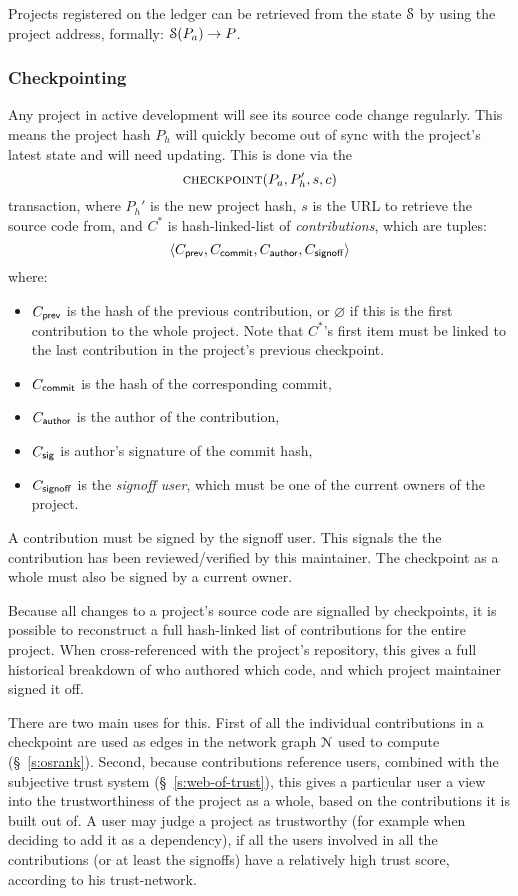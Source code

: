 Projects registered on the ledger can be retrieved from the state $\mathcal{S}$ by
using the project address, formally: $\mathcal{S}(P_a) \to P$.

\subsubsection{Checkpointing} Any project in active development will see its
source code change regularly. This means the project hash $P_h$ will quickly
become out of sync with the project's latest state and will need updating. This
is done via the
\[
    \text{\normalfont\scshape checkpoint}\small{\lparen P_a, P_h', s, c\rparen}
\]
transaction, where $P_h'$ is the new project hash, $s$ is the URL to
retrieve the source code from, and $C^*$ is hash-linked-list of
\emph{contributions}, which are tuples:
\[
   \langle C_{\mathsf{prev}}, C_{\mathsf{commit}}, C_{\mathsf{author}}, C_{\mathsf{signoff}}\rangle
\]
where:
\begin{itemize}
\item $C_{\mathsf{prev}}$ is the hash of the previous contribution, or
  $\varnothing$ if this is the first contribution to the whole
  project. Note that $C^*$'s first item must be linked to the last
  contribution in the project's previous checkpoint.
\item $C_{\mathsf{commit}}$ is the hash of the corresponding commit,
\item $C_{\mathsf{author}}$ is the author of the contribution,
\item $C_{\mathsf{sig}}$ is author's signature of the commit hash,
\item $C_{\mathsf{signoff}}$ is the \emph{signoff user}, which must be
  one of the current owners of the project.
\end{itemize}
A contribution must be signed by the signoff user. This signals the
the contribution has been reviewed/verified by this maintainer. The
checkpoint as a whole must also be signed by a current owner.

Because all changes to a project's source code are signalled by
checkpoints, it is possible to reconstruct a full hash-linked list of
contributions for the entire project. When cross-referenced with the
project's repository, this gives a full historical breakdown of who
authored which code, and which project maintainer signed it off.

There are two main uses for this. First of all the individual
contributions in a checkpoint are used as edges in the network graph
$\mathcal{N}$ used to compute \osrank{} (\S~\ref{s:osrank}).
Second, because contributions reference users, combined with the
subjective trust system (\S~\ref{s:web-of-trust}), this gives a
particular user a view into the trustworthiness of the project as a
whole, based on the contributions it is built out of. A user may judge
a project as trustworthy (for example when deciding to add it as a
dependency), if all the users involved in all the contributions (or at
least the signoffs) have a relatively high trust score, according to
his trust-network.


